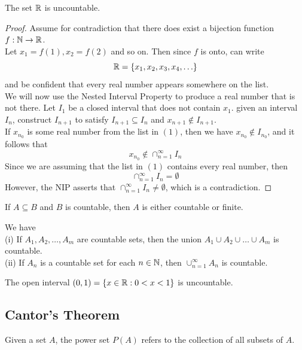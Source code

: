 \documentclass[11pt]{article}
\begin{document}
\theorem
The set $\mathbb{R}$ is uncountable.

\begin{proof}
	Assume for contradiction that there does exist a bijection function $f: \mathbb{N} \rightarrow \mathbb{R}$. \\
	Let $x_1 = f(1), x_2 = f(2)$ and so on. Then since $f$ is onto, can write
	\begin{equation}
			\mathbb{R} = \{x_1, x_2, x_3, x_4, \hdots\}
	\end{equation}
	and be confident that every real number appears somewhere on the list. \\
	We will now use the Nested Interval Property to produce a real number that is not there.
	Let $I_1$ be a closed interval that does not contain $x_1$. given an interval $I_n$, construct $I_{n+1}$ to satisfy $I_{n+1} \subseteq I_n$ and $x_{n+1} \notin I_{n+1}$. \\
	If $x_{n_0}$ is some real number from the list in $(1)$, then we have $x_{n_0} \notin I_{n_0}$, and it follows that
	$$ x_{n_0} \notin \cap_{n=1}^\infty I_n$$
	Since we are assuming that the list in $(1)$ contains every real number, then
	$$\cap_{n=1}^\infty I_n = \emptyset$$
	However, the NIP asserts that $\cap_{n=1}^\infty I_n \neq \emptyset$, which is a contradiction.
\end{proof}

\theorem If $A \subseteq B$ and $B$ is countable, then $A$ is either countable or finite.

\theorem We have\\
(i) If $A_1, A_2, \hdots, A_m$ are countable sets, then the union $A_1 \cup A_2 \cup \hdots \cup A_m$ is countable. \\
(ii) If $A_n$ is a countable set for each $n \in \mathbb{N}$, then $\cup_{n=1}^\infty A_n$ is countable.

\theorem The open interval $(0,1) = \{x \in \mathbb{R}: 0 < x <1\}$ is uncountable.

\subsection{Cantor's Theorem}
\notation
Given a set $A$, the power set $P(A)$ refers to the collection of all subsets of $A$.
\end{document}
